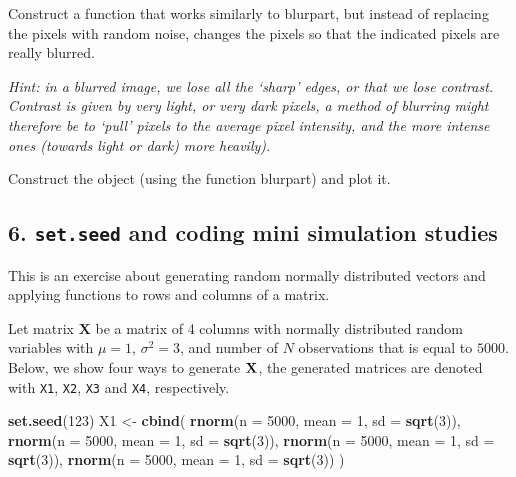 \documentclass[]{article}
\newenvironment{Shaded}{\begin{snugshade}}{\end{snugshade}}
\newcommand{\DataTypeTok}[1]{\textcolor[rgb]{0.13,0.29,0.53}{#1}}
\newcommand{\DecValTok}[1]{\textcolor[rgb]{0.00,0.00,0.81}{#1}}
\newcommand{\KeywordTok}[1]{\textcolor[rgb]{0.13,0.29,0.53}{\textbf{#1}}}
\newcommand{\NormalTok}[1]{#1}
\newcommand{\StringTok}[1]{\textcolor[rgb]{0.31,0.60,0.02}{#1}}
\begin{document}
Construct a function that works similarly to blurpart, but instead of
replacing the pixels with random noise, changes the pixels so that the
indicated pixels are really blurred.

\emph{Hint: in a blurred image, we lose all the `sharp' edges, or that
we lose contrast. Contrast is given by very light, or very dark pixels,
a method of blurring might therefore be to `pull' pixels to the average
pixel intensity, and the more intense ones (towards light or dark) more
heavily).}

Construct the object (using the function blurpart) and plot it.

\hypertarget{set.seed-and-coding-mini-simulation-studies}{%
\subsection{\texorpdfstring{6. \texttt{set.seed} and coding mini
simulation
studies}{6. set.seed and coding mini simulation studies}}\label{set.seed-and-coding-mini-simulation-studies}}

This is an exercise about generating random normally distributed vectors
and applying functions to rows and columns of a matrix.

Let matrix \(\mathbf{X}\) be a matrix of 4 columns with normally
distributed random variables with \(\mu=1\), \(\sigma^2=3\), and number
of \(N\) observations that is equal to \(5000\). Below, we show four
ways to generate \(\bf{X}\), the generated matrices are denoted with
\texttt{X1}, \texttt{X2}, \texttt{X3} and \texttt{X4}, respectively.

\begin{Shaded}
\begin{Highlighting}[]
\KeywordTok{set.seed}\NormalTok{(}\DecValTok{123}\NormalTok{)}
\NormalTok{X1 <-}\StringTok{ }\KeywordTok{cbind}\NormalTok{(}
  \KeywordTok{rnorm}\NormalTok{(}\DataTypeTok{n =} \DecValTok{5000}\NormalTok{, }\DataTypeTok{mean =} \DecValTok{1}\NormalTok{, }\DataTypeTok{sd =} \KeywordTok{sqrt}\NormalTok{(}\DecValTok{3}\NormalTok{)), }
  \KeywordTok{rnorm}\NormalTok{(}\DataTypeTok{n =} \DecValTok{5000}\NormalTok{, }\DataTypeTok{mean =} \DecValTok{1}\NormalTok{, }\DataTypeTok{sd =} \KeywordTok{sqrt}\NormalTok{(}\DecValTok{3}\NormalTok{)),}
  \KeywordTok{rnorm}\NormalTok{(}\DataTypeTok{n =} \DecValTok{5000}\NormalTok{, }\DataTypeTok{mean =} \DecValTok{1}\NormalTok{, }\DataTypeTok{sd =} \KeywordTok{sqrt}\NormalTok{(}\DecValTok{3}\NormalTok{)), }
  \KeywordTok{rnorm}\NormalTok{(}\DataTypeTok{n =} \DecValTok{5000}\NormalTok{, }\DataTypeTok{mean =} \DecValTok{1}\NormalTok{, }\DataTypeTok{sd =} \KeywordTok{sqrt}\NormalTok{(}\DecValTok{3}\NormalTok{))}
\NormalTok{) }
\end{Highlighting}
\end{Shaded}
\end{document}
